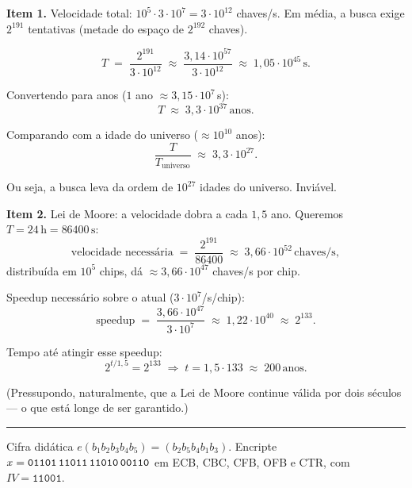 \documentclass[12pt,a4paper]{article}
\newcommand{\exercicio}[1]{%
    \par\vspace{1.2em}
    \noindent
    {\color{black!55}\rule[-0.25em]{3pt}{1.6em}}%
    \hspace{0.6em}{\Large\bfseries Exerc\'{i}cio #1}
    \par\vspace{-0.4em}
    \noindent{\color{black!35}\rule{\textwidth}{0.4pt}}
    \par\vspace{0.35em}
}
\newenvironment{resposta}{%
    \begin{respostabox}
    \color{red!70!black}\sloppy
}{%
    \end{respostabox}
}
\begin{document}
\begin{resposta}

\textbf{Item 1.} Velocidade total: $10^5 \cdot 3 \cdot 10^7 = 3 \cdot 10^{12}$ chaves/s. Em média, a busca exige $2^{191}$ tentativas (metade do espaço de $2^{192}$ chaves).

\[
T \;=\; \frac{2^{191}}{3 \cdot 10^{12}} \;\approx\; \frac{3{,}14 \cdot 10^{57}}{3 \cdot 10^{12}} \;\approx\; 1{,}05 \cdot 10^{45}\,\mathrm{s}.
\]

Convertendo para anos ($1$ ano $\approx 3{,}15 \cdot 10^7$\,s):
\[
T \;\approx\; 3{,}3 \cdot 10^{37}\,\text{anos}.
\]

Comparando com a idade do universo ($\approx 10^{10}$ anos):
\[
\frac{T}{T_{\text{universo}}} \;\approx\; 3{,}3 \cdot 10^{27}.
\]

Ou seja, a busca leva da ordem de $10^{27}$ idades do universo. Inviável.

\textbf{Item 2.} Lei de Moore: a velocidade dobra a cada $1{,}5$ ano. Queremos $T = 24\,\mathrm{h} = 86400\,\mathrm{s}$:
\[
\text{velocidade necessária} \;=\; \frac{2^{191}}{86400} \;\approx\; 3{,}66 \cdot 10^{52}\,\text{chaves/s},
\]
distribuída em $10^5$ chips, dá $\approx 3{,}66 \cdot 10^{47}$ chaves/s por chip.

Speedup necessário sobre o atual ($3 \cdot 10^7$/s/chip):
\[
\text{speedup} \;=\; \frac{3{,}66 \cdot 10^{47}}{3 \cdot 10^7} \;\approx\; 1{,}22 \cdot 10^{40} \;\approx\; 2^{133}.
\]

Tempo até atingir esse speedup:
\[
2^{t/1{,}5} = 2^{133} \;\Longrightarrow\; t = 1{,}5 \cdot 133 \;\approx\; \boxed{200\,\text{anos}}.
\]

(Pressupondo, naturalmente, que a Lei de Moore continue válida por dois séculos — o que está longe de ser garantido.)

\end{resposta}

\exercicio{10}
Cifra didática $e(b_1 b_2 b_3 b_4 b_5) = (b_2 b_5 b_4 b_1 b_3)$. Encripte $x = \texttt{01101\,11011\,11010\,00110}$ em ECB, CBC, CFB, OFB e CTR, com $IV = \texttt{11001}$.
\end{document}
